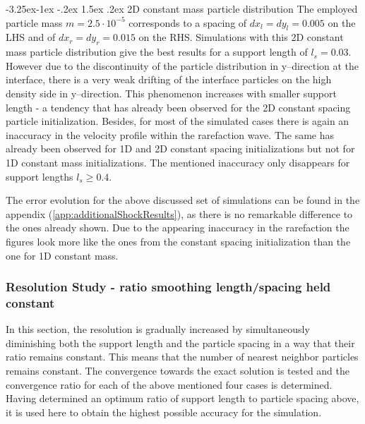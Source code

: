 \documentclass[11pt,a4paper,twoside]{report}
\makeatletter
\renewcommand\paragraph{\@startsection{paragraph}{4}{\z@}%
  {-3.25ex\@plus -1ex \@minus -.2ex}%
  {1.5ex \@plus .2ex}%
  {\normalfont\normalsize\bfseries}}
\makeatother
\begin{document}
\paragraph{2D constant mass particle distribution}
The employed particle mass $m=2.5\cdot10^{-5}$ corresponds to a spacing of $dx_l=dy_l=0.005$ on the LHS and of $dx_r=dy_r=0.015$ on the RHS.
Simulations with this 2D constant mass particle distribution give the best results for a support length of $l_s=0.03$. However due to the discontinuity of the particle distribution in y--direction at the interface, there is a very weak drifting of the interface particles on the high density side in y--direction. This phenomenon increases with smaller support length - a tendency that has already been observed for the 2D constant spacing particle initialization. 
Besides, for most of the simulated cases there is again an inaccuracy in the velocity profile  within the rarefaction wave. The same has already been observed for 1D and 2D constant spacing initializations but not for 1D constant mass initializations.
The mentioned inaccuracy only disappears for support lengths  $l_s\geq0.4$.

The error evolution for the above discussed set of simulations can be found in the appendix (\ref{app:additionalShockResults}), as there is no remarkable difference to the ones already shown. Due to the appearing inaccuracy in the rarefaction the figures look more like the ones from the constant spacing initialization than the one for 1D constant mass. 



\subsubsection{Resolution Study - ratio smoothing length/spacing held constant}
In this section, the resolution is gradually increased by simultaneously diminishing both the support length and the particle spacing in a way that their ratio remains constant. This means that the number of nearest neighbor particles remains constant. 
The convergence towards the exact solution is tested and the convergence ratio for each of the above mentioned four cases is determined. Having determined an optimum ratio of support length to particle spacing above, it is used here to obtain the highest possible accuracy for the simulation. \\
\\
\indent
\end{document}
